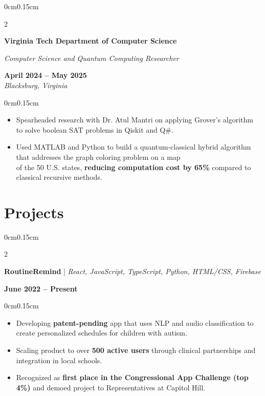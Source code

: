 \documentclass[10pt, letterpaper]{article}
\newenvironment{highlights}{
    \begin{itemize}[topsep=0pt, parsep=0pt, partopsep=0pt, itemsep=0pt, leftmargin=0.6cm]
}{
    \end{itemize}
}
\newenvironment{onecolentry}{
    \begin{adjustwidth}{0cm}{0.15cm}
}{
    \end{adjustwidth}
}
\newenvironment{twocolentry}[2][]{
    \onecolentry
    \def\secondColumn{#2}
    \setcolumnwidth{\fill, 4cm}
    \begin{paracol}{2}
}{
    \switchcolumn \raggedleft \secondColumn
    \end{paracol}
    \endonecolentry
}
\begin{document}
    \vspace{0.05cm}

    \begin{twocolentry}{\textbf{April 2024 -- May 2025} \\ \textit{Blacksburg, Virginia}}
        \textbf{Virginia Tech Department of Computer Science}
        
        \textit{Computer Science and Quantum Computing Researcher}
    \end{twocolentry}
    \vspace{-0.1cm}
    \begin{onecolentry}
        \begin{highlights}
            \item Spearheaded research with Dr. Atul Mantri on applying Grover's algorithm to solve boolean SAT problems in Qiskit and Q\#.
            \item Used MATLAB and Python to build a quantum-classical hybrid algorithm that addresses the graph coloring problem on a map \\ of the 50 U.S. states, \textbf{reducing computation cost by 65\%} compared to classical recursive methods.
        \end{highlights}
    \end{onecolentry}

    \vspace{0.05cm}

    \section{Projects}
    \vspace{0.1cm}

    \begin{twocolentry}{\textbf{June 2022 -- Present}}
        \textbf{RoutineRemind} | \textit{React, JavaScript, TypeScript, Python, HTML/CSS, Firebase}
    \end{twocolentry}
    \vspace{-0.1cm}
    \begin{onecolentry}
        \begin{highlights}
            \item Developing \textbf{patent-pending} app that uses NLP and audio classification to create personalized schedules for children with autism.
            \item Scaling product to over \textbf{500 active users} through clinical partnerships and integration in local schools.
            \item Recognized as \textbf{first place in the Congressional App Challenge (top 4\%)} and demoed project to Representatives at Capitol Hill.
        \end{highlights}
    \end{onecolentry}
\end{document}
